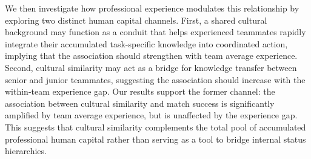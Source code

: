 \documentclass[10pt]{article}
\begin{document}



We then investigate how professional experience modulates this relationship by exploring two distinct human capital channels. First, a shared cultural background may function as a conduit that helps experienced teammates rapidly integrate their accumulated task-specific knowledge into coordinated action, implying that the association should strengthen with team average experience. Second, cultural similarity may act as a bridge for knowledge transfer between senior and junior teammates, suggesting the association should increase with the within-team experience gap. Our results support the former channel: the association between cultural similarity and match success is significantly amplified by team average experience, but is unaffected by the experience gap. This suggests that cultural similarity complements the total pool of accumulated professional human capital rather than serving as a tool to bridge internal status hierarchies.
\end{document}
